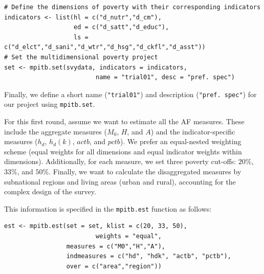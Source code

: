 \begin{verbatim}
# Define the dimensions of poverty with their corresponding indicators
indicators <- list(hl = c("d_nutr","d_cm"),
                   ed = c("d_satt","d_educ"),
                   ls = c("d_elct","d_sani","d_wtr","d_hsg","d_ckfl","d_asst"))
# Set the multidimensional poverty project
set <- mpitb.set(svydata, indicators = indicators, 
                         name = "trial01", desc = "pref. spec")
\end{verbatim}

Finally, we define a short name (\texttt{"trial01"}) and description (\texttt{"pref.\ spec"}) for our project using \texttt{mpitb.set}.

For this first round, assume we want to estimate all the AF measures. These include the aggregate measures (\(M_0\), \(H\), and \(A\)) and the indicator-specific measures (\(h_d\), \(h_d(k)\), \(actb\), and \(pctb\)). We prefer an equal-nested weighting scheme (equal weights for all dimensions and equal indicator weights within dimensions). Additionally, for each measure, we set three poverty cut-offs: \(20\%\), \(33\%\), and \(50\%\). Finally, we want to calculate the disaggregated measures by subnational regions and living areas (urban and rural), accounting for the complex design of the survey.

This information is specified in the \texttt{mpitb.est} function as follows:

\begin{verbatim}
est <- mpitb.est(set = set, klist = c(20, 33, 50),
                         weights = "equal", 
                 measures = c("M0","H","A"), 
                 indmeasures = c("hd", "hdk", "actb", "pctb"),
                 over = c("area","region"))
\end{verbatim}

